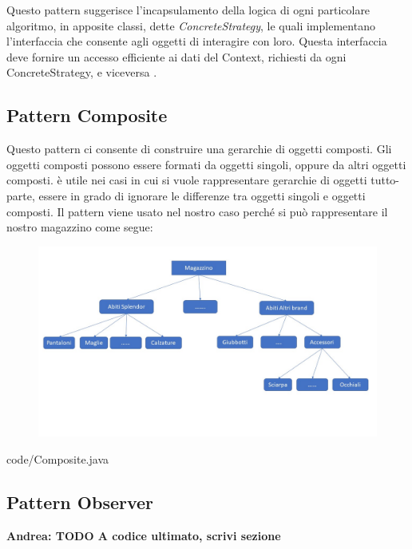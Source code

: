 \documentclass[12pt]{article}
\newcommand{\andrea}[1]{{\bf \color{mauve} Andrea: #1 }}
\begin{document}
Questo pattern suggerisce l’incapsulamento della logica di ogni
particolare algoritmo, in apposite classi, dette {\em ConcreteStrategy}, le quali implementano l’interfaccia che consente agli oggetti di interagire con loro. Questa interfaccia deve fornire un accesso efficiente ai dati del Context, richiesti da ogni ConcreteStrategy, e viceversa \cite{gof_sunt}.


\subsection{Pattern Composite}
Questo pattern ci consente di construire una gerarchie di oggetti composti. Gli oggetti composti possono essere formati da oggetti singoli, oppure da altri oggetti composti. è utile nei casi in cui si vuole rappresentare gerarchie di oggetti tutto-parte, essere in grado di ignorare le differenze tra oggetti singoli e oggetti composti. 
Il pattern viene usato nel nostro caso perché si può rappresentare il nostro magazzino come segue:

\begin{figure}
    \centering
    \includegraphics[width=1\linewidth]{images/Composite.jpg}
\end{figure}


{code/Composite.java}

\subsection{Pattern Observer}

\andrea{\textbf{TODO} A codice ultimato, scrivi sezione}


\newpage

\printbibliography
\end{document}
